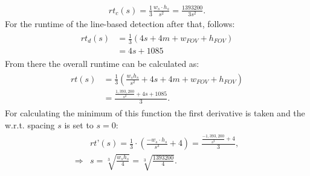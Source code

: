 \documentclass[journal,final,a4paper,twoside]{PS}
\begin{document}
\begin{align}
rt_c (s) =\frac{1}{3} \frac{w_s\cdot h_s}{ s^2} =\frac{1393200}{3s^2} .
\end{align}
For the runtime of the line-based detection after that, follows:
\begin{align}\begin{split}
rt_d (s) &=\frac{1}{3}\left( 4s + 4 m + w_{FOV} + h_{FOV}\right)\\& = 4s + 1085\end{split}
\end{align}
From there the overall runtime can be calculated as:
\begin{align}\begin{split}
rt(s) &=\frac{1}{3}\left(\frac{w_s h_s}{s^2} + 4s + 4m + w_{FOV} + h_{FOV}\right)\\& = \frac{\frac{1,393,200}{s^2} + 4s +1085}{3}.\end{split}
\end{align}
For calculating the minimum of this function the first derivative is taken and the w.r.t. spacing $s$ is set to $s=0$:
\begin{align}\begin{split}
&rt’(s) = \frac{1}{3} \cdot \left( \frac{-w_s \cdot h_s}{s^3 }  + 4\right) = \frac{ \frac{-1,393,200}{s^3}+ 4}{3},\\
\Rightarrow &s = \sqrt[3]{\frac{w_s  h_s}{4}} = \sqrt[3]{\frac{1393200}{4}}. \end{split}
\end{align}
\end{document}
